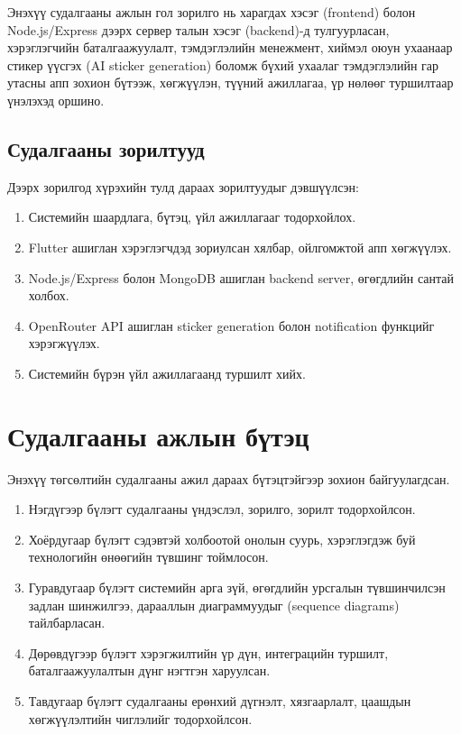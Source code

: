 Энэхүү судалгааны ажлын гол зорилго нь харагдах хэсэг (frontend) болон Node.js/Express дээрх сервер талын хэсэг (backend)-д тулгуурласан, хэрэглэгчийн баталгаажуулалт, тэмдэглэлийн менежмент, хиймэл оюун ухаанаар стикер үүсгэх (AI sticker generation) боломж бүхий ухаалаг тэмдэглэлийн гар утасны апп зохион бүтээж, хөгжүүлэн, түүний ажиллагаа, үр нөлөөг туршилтаар үнэлэхэд оршино.

\subsection{Судалгааны зорилтууд}

Дээрх зорилгод хүрэхийн тулд дараах зорилтуудыг дэвшүүлсэн:

\begin{enumerate}
    \item Системийн шаардлага, бүтэц, үйл ажиллагааг тодорхойлох.
    \item Flutter ашиглан хэрэглэгчдэд зориулсан хялбар, ойлгомжтой апп хөгжүүлэх.
    \item Node.js/Express болон MongoDB ашиглан backend server, өгөгдлийн сантай холбох.
    \item OpenRouter API ашиглан sticker generation болон notification функцийг хэрэгжүүлэх.
    \item Системийн бүрэн үйл ажиллагаанд туршилт хийх.
\end{enumerate}

\section{Судалгааны ажлын бүтэц}

Энэхүү төгсөлтийн судалгааны ажил дараах бүтэцтэйгээр зохион байгуулагдсан.

\begin{enumerate}
    \item Нэгдүгээр бүлэгт судалгааны үндэслэл, зорилго, зорилт тодорхойлсон.
    \item Хоёрдугаар бүлэгт сэдэвтэй холбоотой онолын суурь, хэрэглэгдэж буй технологийн өнөөгийн түвшинг тоймлосон.
    \item Гуравдугаар бүлэгт системийн арга зүй, өгөгдлийн урсгалын түвшинчилсэн задлан шинжилгээ, дарааллын диаграммуудыг (sequence diagrams) тайлбарласан.
    \item Дөрөвдүгээр бүлэгт хэрэгжилтийн үр дүн, интеграцийн туршилт, баталгаажуулалтын дүнг нэгтгэн харуулсан.
    \item Тавдугаар бүлэгт судалгааны ерөнхий дүгнэлт, хязгаарлалт, цаашдын хөгжүүлэлтийн чиглэлийг тодорхойлсон.
\end{enumerate}
